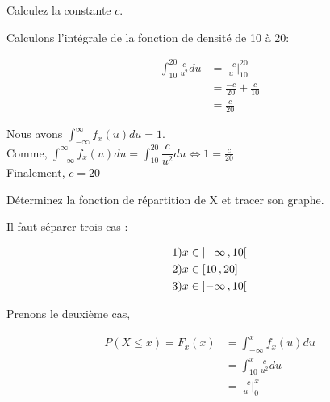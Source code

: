 \begin{exo}
	\begin{subexo}{Calculez la constante $c$.}
		\begin{center}
			Calculons l'intégrale de la fonction de densité de 10 à 20: 
		\end{center}
		\begin{align*}
			\displaystyle\int_{10}^{20}{\frac{c}{u^2}}du &= \frac{-c}{u}\bigg\vert_{10}^{20}\\
			&= \frac{-c}{20} + \frac{c}{10} \\
			&= \frac{c}{20}
		\end{align*}
		\begin{center}
			Nous avons $\displaystyle\int_{-\infty}^{\infty}{f_x(u)}du = 1$. \\ Comme, $\displaystyle\int_{-\infty}^{\infty}{f_x(u)}du = \displaystyle\int_{10}^{20}{\dfrac{c}{u^2}}du \iff 1 = \frac{c}{20}$ \\
			Finalement, $c=20$
		\end{center}
	\end{subexo}
	\begin{subexo}{Déterminez la fonction de répartition de X et tracer son graphe.}
		\begin{center}
			Il faut séparer trois cas : 
		\end{center}
		\begin{align*}
			&1) x \in \mathopen{]}-\infty\mathpunct{},10\mathclose{[} \\
			&2) x \in \mathopen{[}10\mathpunct{},20\mathclose{]} \\
			&3) x \in \mathopen{]}-\infty\mathpunct{},10\mathclose{[} \\
		\end{align*}
		\begin{center}
			Prenons le deuxième cas,
		\end{center}
		\begin{align*}
			P(X \leq x) = F_x(x) &= \int_{-\infty}^{x}{f_x(u)}du \\
			&= \displaystyle\int_{10}^{x}{\frac{c}{u^2}}du \\
			&= \frac{-c}{u}\bigg\vert_{0}^{x} \\

\end{align*}
\end{subexo}
\end{exo}

